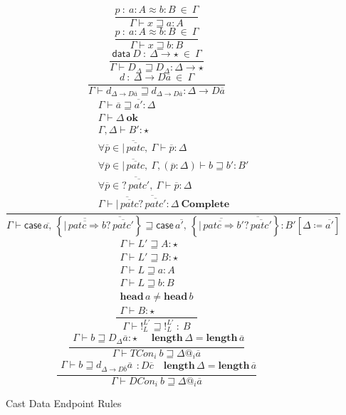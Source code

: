\begin{figure}
\[
\frac{
  p\ :\ a:A\approx b:B\ \in\ \varGamma
}{
  \varGamma\vdash x\sqsupseteq a:A
  }
\]
\[
\frac{
  p\ :\ a:A\approx b:B\ \in\ \varGamma
}{\varGamma\vdash x\sqsupseteq b:B}
\]
\[
\frac{\mathsf{data}\ D\ :\ \Delta\rightarrow\star\ \in\ \varGamma}{\varGamma\vdash D_{\Delta}\sqsupseteq D_{\Delta}:\Delta\rightarrow\star}
\]
\[
\frac{d\ :\ \Delta\rightarrow D\overline{a}\ \in\ \varGamma}{\varGamma\vdash d_{\Delta\rightarrow D\overline{a}}\sqsupseteq d_{\Delta\rightarrow D\overline{a}}:\Delta\rightarrow D\overline{a}}
\]
\[
\frac{\begin{array}{c}
\varGamma\vdash\overline{a}\sqsupseteq\overline{a'}:\Delta\\
\varGamma\vdash\Delta\ \mathbf{ok}\\
\varGamma,\Delta\vdash B':\star\\
\forall\overline{p}\in\overline{|\,\overline{patc}},\:\varGamma\vdash\overline{p}:\Delta\\
\forall\overline{p}\in\overline{|\,\overline{patc}},\:\varGamma,\left(\overline{p}:\Delta\right)\vdash b\sqsupseteq b':B'\\
\forall\overline{p}\in\overline{?\,\overline{patc'}},\:\varGamma\vdash\overline{p}:\Delta\\
\varGamma\vdash\overline{|\,\overline{patc}}\overline{?\,\overline{patc'}}:\Delta\ \mathbf{Complete}
\end{array}}{
  \varGamma\vdash\mathsf{case}\,\overline{a,}\,\left\{ \overline{|\,\overline{patc\Rightarrow}b} \overline{?\,\overline{patc'}} \right\} \sqsupseteq\mathsf{case}\,\overline{a',}\,\left\{ \overline{|\,\overline{patc\Rightarrow}b'} \overline{?\,\overline{patc'}} \right\} :B'\left[\Delta\coloneqq\overline{a'}\right]}
\]
\[
\frac{\begin{array}{c}
\varGamma\vdash L'\sqsupseteq A:\star\\
\varGamma\vdash L'\sqsupseteq B:\star\\
\varGamma\vdash L\sqsupseteq a:A\\
\varGamma\vdash L\sqsupseteq b:B\\
\mathbf{head}\,a\neq\mathbf{head}\,b\\
\varGamma\vdash B:\star
\end{array}}{\varGamma\vdash!_{L}^{L'}\sqsupseteq!_{L}^{L'}\ :\ B}
\]
\[
\frac{\begin{array}{c}
\varGamma\vdash b\sqsupseteq D_{\Delta}\overline{a}:\star\end{array}\quad\mathbf{length}\,\Delta=\mathbf{length}\,\overline{a}}{\varGamma\vdash TCon_{i}\ b\sqsupseteq\Delta@_{i}\overline{a}}
\]
\[
\frac{\begin{array}{c}
\varGamma\vdash b\sqsupseteq d_{\Delta\rightarrow D\overline{b}}\overline{a}\end{array}:D\overline{c}\quad\mathbf{length}\,\Delta=\mathbf{length}\,\overline{a}}{\varGamma\vdash DCon_{i}\ b\sqsupseteq\Delta@_{i}\overline{a}}
\]

\caption{Cast Data Endpoint Rules}
\label{fig:cast-Data-Endpoint-Rules}
\end{figure}

